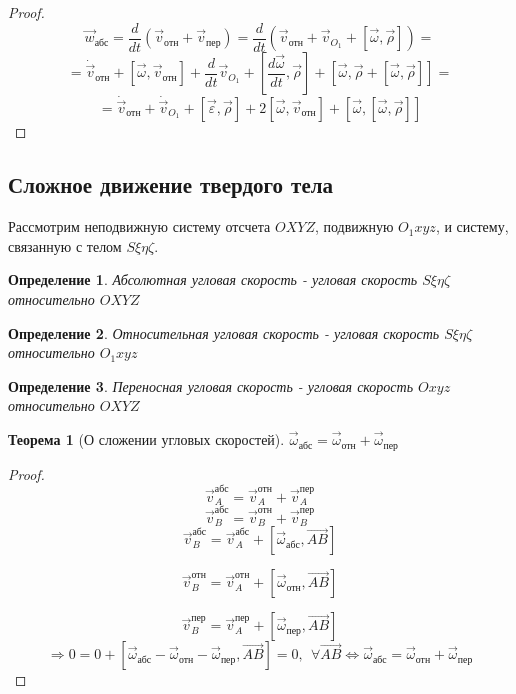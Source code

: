\documentclass{article}
\newtheorem*{df}{Определение}
\newtheorem{teo}{Теорема}
\begin{document}
  \begin{proof}
  $$ \vec{w}_{\text{абс}} = \frac{d}{dt}(\vec{v}_{\text{отн}} + \vec{v}_{\text{пер}}) = \frac{d}{dt} (\vec{v}_{\text{отн}} + \vec{v}_{O_1} + [\vec{\omega}, \vec{\rho}]) = $$ 
  $$ = \dot{\vec{v}}_{\text{отн}} + [\vec{\omega}, \vec{v}_{\text{отн}}] + \frac{d}{dt}\vec{v}_{O_1} + \left[\frac{d\vec{\omega}}{dt}, \vec{\rho}\right] + [\vec{\omega}, \vec{\rho} + [\vec{\omega}, \vec{\rho}]] = $$ 
  $$ = \dot{\vec{v}}_{\text{отн}} + \dot{\vec{v}}_{O_1} + [\vec{\varepsilon}, \vec{\rho}] + 2[\vec{\omega}, \vec{v}_{\text{отн}}] + [\vec{\omega}, [\vec{\omega}, \vec{\rho}]] $$
  \end{proof}

  \subsection{Сложное движение твердого тела}
  Рассмотрим неподвижную систему отсчета $OXYZ$, подвижную $O_1xyz$, и систему, связанную с телом $S\xi\eta\zeta$.
  \begin{df} Абсолютная угловая скорость - угловая скорость $S\xi\eta\zeta$ относительно $OXYZ$\end{df}
  \begin{df} Относительная угловая скорость - угловая скорость $S\xi\eta\zeta$ относительно $O_1xyz$\end{df}
  \begin{df} Переносная угловая скорость - угловая скорость $Oxyz$ относительно $OXYZ$\end{df}  
  \begin{teo}[О сложении угловых скоростей] $\vec{\omega}_{\text{абс}} = \vec{\omega}_{\text{отн}} + \vec{\omega}_{\text{пер}}$ \end{teo}
  \begin{proof}
  $$ \vec{v}_A^{\text{абс}} = \vec{v}_A^{\text{отн}} + \vec{v}_A^{\text{пер}} $$
  $$ \vec{v}_B^{\text{абс}} = \vec{v}_B^{\text{отн}} + \vec{v}_B^{\text{пер}} $$
  $$ \vec{v}_B^{\text{абс}} = \vec{v}_A^\text{абс} + [\vec{\omega}_{\text{абс}}, \overrightarrow{AB}] $$

  $$ \vec{v}_B^{\text{отн}} = \vec{v}_A^\text{отн} + [\vec{\omega}_{\text{отн}}, \overrightarrow{AB}] $$

  $$ \vec{v}_B^{\text{пер}} = \vec{v}_A^\text{пер} + [\vec{\omega}_{\text{пер}}, \overrightarrow{AB}] $$
  $$ \Rightarrow 0 = 0 + [\vec{\omega}_{\text{абс}} - \vec{\omega}_{\text{отн}} - \vec{\omega}_{\text{пер}}, \overrightarrow{AB}] = 0,~~ \forall \overrightarrow{AB} \Leftrightarrow \vec{\omega}_{\text{абс}} = \vec{\omega}_{\text{отн}} + \vec{\omega}_{\text{пер}} $$
  \end{proof}
\end{document}
